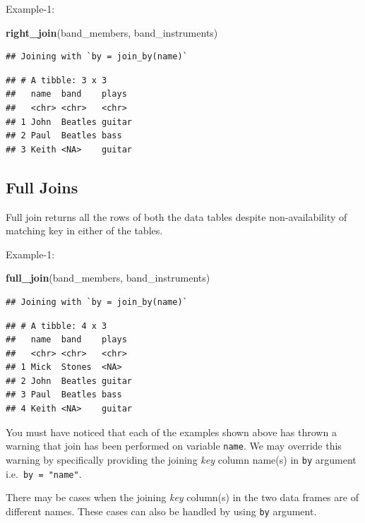 \documentclass[
]{book}
\newenvironment{Shaded}{\begin{snugshade}}{\end{snugshade}}
\newcommand{\FunctionTok}[1]{\textcolor[rgb]{0.13,0.29,0.53}{\textbf{#1}}}
\newcommand{\NormalTok}[1]{#1}
\begin{document}
Example-1:

\begin{Shaded}
\begin{Highlighting}[]
\FunctionTok{right\_join}\NormalTok{(band\_members, band\_instruments)}
\end{Highlighting}
\end{Shaded}

\begin{verbatim}
## Joining with `by = join_by(name)`
\end{verbatim}

\begin{verbatim}
## # A tibble: 3 x 3
##   name  band    plays 
##   <chr> <chr>   <chr> 
## 1 John  Beatles guitar
## 2 Paul  Beatles bass  
## 3 Keith <NA>    guitar
\end{verbatim}

\hypertarget{full-joins}{%
\subsection{Full Joins}\label{full-joins}}

Full join returns all the rows of both the data tables despite non-availability of matching key in either of the tables.

Example-1:

\begin{Shaded}
\begin{Highlighting}[]
\FunctionTok{full\_join}\NormalTok{(band\_members, band\_instruments)}
\end{Highlighting}
\end{Shaded}

\begin{verbatim}
## Joining with `by = join_by(name)`
\end{verbatim}

\begin{verbatim}
## # A tibble: 4 x 3
##   name  band    plays 
##   <chr> <chr>   <chr> 
## 1 Mick  Stones  <NA>  
## 2 John  Beatles guitar
## 3 Paul  Beatles bass  
## 4 Keith <NA>    guitar
\end{verbatim}

You must have noticed that each of the examples shown above has thrown a warning that join has been performed on variable \texttt{name}. We may override this warning by specifically providing the joining \emph{key} column name(s) in \texttt{by} argument i.e.~\texttt{by\ =\ "name"}.

There may be cases when the joining \emph{key} column(s) in the two data frames are of different names. These cases can also be handled by using \texttt{by} argument.
\end{document}
